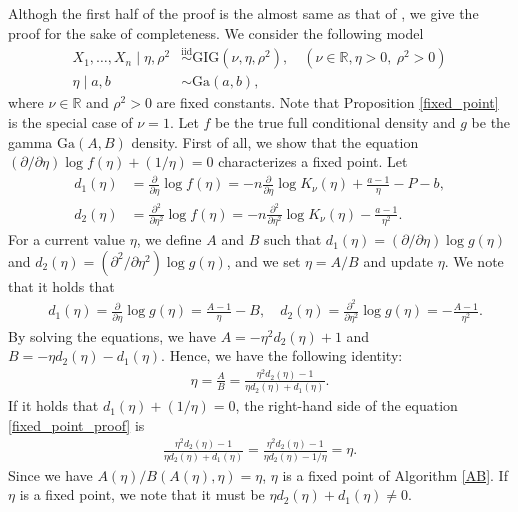 \documentclass[11pt]{article}
\theoremstyle{plain}
\theoremstyle{definition}
\begin{document}
Althogh the first half of the proof is the almost same as that of \cite{M19}, we give the proof for the sake of completeness. We consider the following model
\begin{align*}
X_{1},\dots,X_{n}\mid\eta,\rho^2 &\overset{\mathrm{iid}}{\sim}\mathrm{GIG}({\nu},\eta,\rho^2),\quad(\nu\in\mathbb{R} , \eta>0,\ \rho^2>0)\\
\eta\mid a,b&{\sim}\mathrm{Ga}(a,b),
\end{align*} 
where $\nu\in \mathbb{R}$ and $\rho^2>0$ are fixed constants. Note that Proposition \ref{fixed_point} is the special case of $\nu=1$. Let $f$ be the true full conditional density and $g$ be the gamma $\mathrm{Ga}(A,B)$ density. 
First of all, we show that the equation $(\partial/\partial \eta)\log f(\eta)+(1/\eta)=0$ characterizes a fixed point. Let 
\begin{align*}
d_{1}(\eta)&=\frac{\partial}{\partial \eta}\log f(\eta)=-n\frac{\partial}{\partial \eta}\log K_{\nu}(\eta)+\frac{a-1}{\eta}-P-b,\\
d_{2}(\eta)&=\frac{\partial^2}{\partial \eta^2}\log f(\eta)=-n\frac{\partial^2}{\partial \eta^2}\log K_{\nu}(\eta) -\frac{a-1}{\eta^2}.
\end{align*}
For a current value $\eta$, we define $A$ and $B$ such that $d_{1}(\eta)=(\partial/\partial \eta)\log g(\eta)$ and $d_{2}(\eta)=(\partial^2/\partial \eta^2)\log g(\eta)$, and we set $\eta=A/B$ and update $\eta$. We note that it holds that
\begin{align*}
&d_{1}(\eta)=\frac{\partial}{\partial \eta}\log g(\eta)=\frac{A-1}{\eta}-B ,\quad 
d_{2}(\eta)=\frac{\partial^2}{\partial \eta^2}\log g(\eta)=-\frac{A-1}{\eta^2}.
\end{align*}
By solving the equations, we have $A=-\eta^2 d_{2}(\eta)+1$ and $B=-\eta d_{2}(\eta)-d_{1}(\eta)$. Hence, we have the following identity:
\begin{align}\label{fixed_point_proof}
\eta=\frac{A}{B}=\frac{\eta^2 d_{2}(\eta)-1}{\eta d_{2}(\eta)+d_{1}(\eta)}.
\end{align}
If it holds that $d_{1}(\eta)+(1/\eta)=0$, the right-hand side of the equation \eqref{fixed_point_proof} is 
\begin{align*}
\frac{\eta^2 d_{2}(\eta)-1}{\eta d_{2}(\eta)+d_{1}(\eta)}=\frac{\eta^2 d_{2}(\eta)-1}{\eta d_{2}(\eta)-1/\eta}=\eta.
\end{align*}
Since we have $A(\eta)/B(A(\eta),\eta)=\eta$, $\eta$ is a fixed point of Algorithm \eqref{AB}. If $\eta$ is a fixed point, we note that it must be $\eta d_{2}(\eta)+d_{1}(\eta)\neq0$. 
\end{document}

